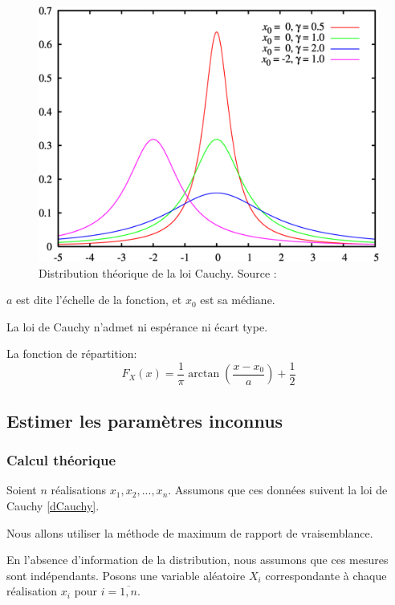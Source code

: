 \documentclass[12pt,a4paper,titlepage]{article}
\numberwithin{equation}{section}
\begin{document}
\begin{figure}[h]
\includegraphics[width=\linewidth]{images/Cauchy_distribution_theoretic.png}
\caption{Distribution théorique de la loi Cauchy. Source : \cite{WikiLoiCauchy}}
\end{figure}

$a$ est dite l'échelle de la fonction, et $x_0$ est sa médiane.

La loi de Cauchy n'admet ni espérance ni écart type.

La fonction de répartition:
\begin{equation}
\label{rCauchy}
{F_X}\left( x \right) = \frac{1}{\pi }\arctan \left( {\frac{{x - {x_0}}}{a}} \right) + \frac{1}{2}
\end{equation}

\subsection{Estimer les paramètres inconnus}

\subsubsection*{Calcul théorique}

Soient $n$ réalisations $x_1, x_2, ..., x_n$. Assumons que ces données suivent la loi de Cauchy \eqref{dCauchy}.

Nous allons utiliser la méthode de maximum de rapport de vraisemblance.

En l'absence d'information de la distribution, nous assumons que ces mesures sont indépendants. Posons une variable aléatoire $X_i$ correspondante à chaque réalisation $x_i$ pour $i=\overline{1, n}$.
\end{document}
